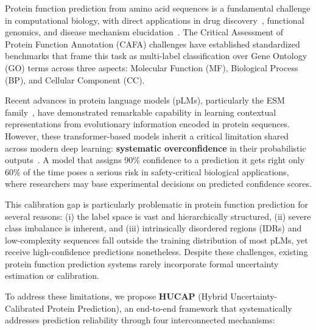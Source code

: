 \documentclass[conference]{IEEEtran}
\begin{document}
Protein function prediction from amino acid sequences is a fundamental challenge in computational biology, with direct applications in drug discovery~\cite{lin2023}, functional genomics, and disease mechanism elucidation~\cite{radivojac2013}. The Critical Assessment of Protein Function Annotation (CAFA) challenges have established standardized benchmarks that frame this task as multi-label classification over Gene Ontology (GO) terms across three aspects: Molecular Function (MF), Biological Process (BP), and Cellular Component (CC).

Recent advances in protein language models (pLMs), particularly the ESM family~\cite{rives2021, lin2023}, have demonstrated remarkable capability in learning contextual representations from evolutionary information encoded in protein sequences. However, these transformer-based models inherit a critical limitation shared across modern deep learning: \textbf{systematic overconfidence} in their probabilistic outputs~\cite{guo2017}. A model that assigns 90\% confidence to a prediction it gets right only 60\% of the time poses a serious risk in safety-critical biological applications, where researchers may base experimental decisions on predicted confidence scores.

This calibration gap is particularly problematic in protein function prediction for several reasons: (i) the label space is vast and hierarchically structured, (ii) severe class imbalance is inherent, and (iii) intrinsically disordered regions (IDRs) and low-complexity sequences fall outside the training distribution of most pLMs, yet receive high-confidence predictions nonetheless. Despite these challenges, existing protein function prediction systems rarely incorporate formal uncertainty estimation or calibration.

To address these limitations, we propose \textbf{HUCAP} (Hybrid Uncertainty-Calibrated Protein Prediction), an end-to-end framework that systematically addresses prediction reliability through four interconnected mechanisms:
\end{document}
